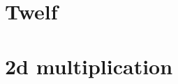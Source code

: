 \documentclass[a4paper, oneside, 10pt, draft]{memoir}
\begin{document}
\section{Twelf}
\label{appendix:twelf}

\clearpage

\clearpage

\clearpage
\section{2d multiplication}

\end{document}
